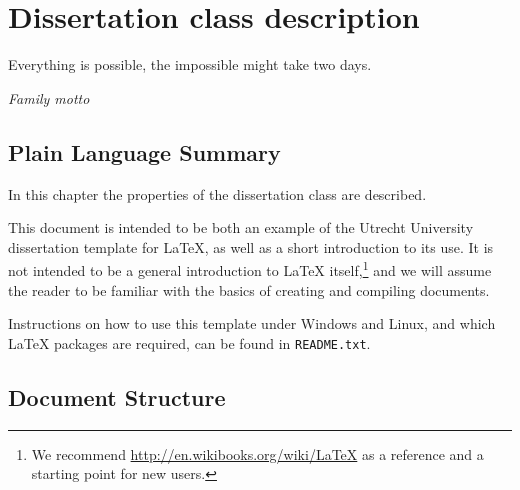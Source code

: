 
\chapter{Dissertation class description}
\label{chapter_1}




\epigraph{
       Everything is possible, the impossible might take two days.
}{\emph{Family motto}}



\section*{Plain Language Summary}
In this chapter the properties of the dissertation class are described. 




\newpage





\noindent This document is intended to be both an example of the Utrecht University dissertation template for \LaTeX, as well as a short introduction to its use. It is not intended to be a general introduction to \LaTeX{} itself,\footnote{We recommend \url{http://en.wikibooks.org/wiki/LaTeX} as a reference and a starting point for new users.} and we will assume the reader to be familiar with the basics of creating and compiling documents.

Instructions on how to use this template under Windows and Linux, and which \LaTeX{} packages are required, can be found in \texttt{README.txt}.


\section{Document Structure}

